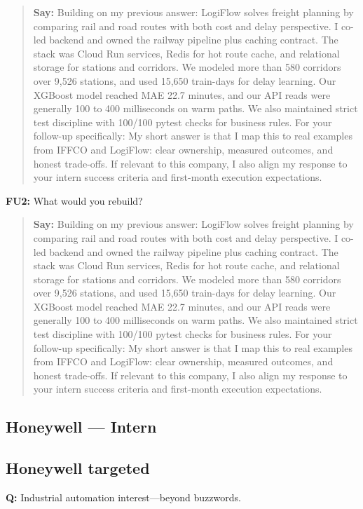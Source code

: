 \documentclass[9pt,a4paper]{article}
\begin{document}
\begin{quote}\small\textbf{Say:} Building on my previous answer: LogiFlow solves freight planning by comparing rail and road routes with both cost and delay perspective. I co-led backend and owned the railway pipeline plus caching contract. The stack was Cloud Run services, Redis for hot route cache, and relational storage for stations and corridors. We modeled more than 580 corridors over 9,526 stations, and used 15,650 train-days for delay learning. Our XGBoost model reached MAE 22.7 minutes, and our API reads were generally 100 to 400 milliseconds on warm paths. We also maintained strict test discipline with 100/100 pytest checks for business rules. For your follow-up specifically: My short answer is that I map this to real examples from IFFCO and LogiFlow: clear ownership, measured outcomes, and honest trade-offs. If relevant to this company, I also align my response to your intern success criteria and first-month execution expectations.\end{quote}
\vspace{2mm}
\textbf{FU2:} What would you rebuild?

\begin{quote}\small\textbf{Say:} Building on my previous answer: LogiFlow solves freight planning by comparing rail and road routes with both cost and delay perspective. I co-led backend and owned the railway pipeline plus caching contract. The stack was Cloud Run services, Redis for hot route cache, and relational storage for stations and corridors. We modeled more than 580 corridors over 9,526 stations, and used 15,650 train-days for delay learning. Our XGBoost model reached MAE 22.7 minutes, and our API reads were generally 100 to 400 milliseconds on warm paths. We also maintained strict test discipline with 100/100 pytest checks for business rules. For your follow-up specifically: My short answer is that I map this to real examples from IFFCO and LogiFlow: clear ownership, measured outcomes, and honest trade-offs. If relevant to this company, I also align my response to your intern success criteria and first-month execution expectations.\end{quote}
\vspace{2mm}
\newpage
\subsection{Honeywell --- Intern}
\subsection{Honeywell targeted}
\textbf{Q:} Industrial automation interest---beyond buzzwords.
\end{document}
